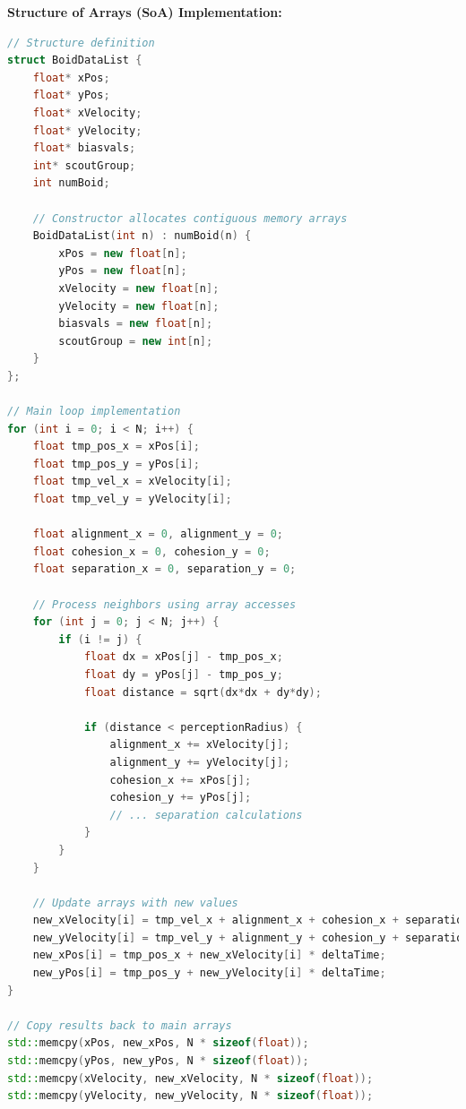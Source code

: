\documentclass[10pt,twocolumn,letterpaper]{article}
\begin{document}
\textbf{Structure of Arrays (SoA) Implementation:}
\begin{lstlisting}[language=C++, caption=SoA data structure and main loop]
// Structure definition
struct BoidDataList {
    float* xPos;
    float* yPos;
    float* xVelocity;
    float* yVelocity;
    float* biasvals;
    int* scoutGroup;
    int numBoid;
    
    // Constructor allocates contiguous memory arrays
    BoidDataList(int n) : numBoid(n) {
        xPos = new float[n];
        yPos = new float[n];
        xVelocity = new float[n];
        yVelocity = new float[n];
        biasvals = new float[n];
        scoutGroup = new int[n];
    }
};

// Main loop implementation
for (int i = 0; i < N; i++) {
    float tmp_pos_x = xPos[i];
    float tmp_pos_y = yPos[i];
    float tmp_vel_x = xVelocity[i];
    float tmp_vel_y = yVelocity[i];
    
    float alignment_x = 0, alignment_y = 0;
    float cohesion_x = 0, cohesion_y = 0;
    float separation_x = 0, separation_y = 0;
    
    // Process neighbors using array accesses
    for (int j = 0; j < N; j++) {
        if (i != j) {
            float dx = xPos[j] - tmp_pos_x;
            float dy = yPos[j] - tmp_pos_y;
            float distance = sqrt(dx*dx + dy*dy);
            
            if (distance < perceptionRadius) {
                alignment_x += xVelocity[j];
                alignment_y += yVelocity[j];
                cohesion_x += xPos[j];
                cohesion_y += yPos[j];
                // ... separation calculations
            }
        }
    }
    
    // Update arrays with new values
    new_xVelocity[i] = tmp_vel_x + alignment_x + cohesion_x + separation_x;
    new_yVelocity[i] = tmp_vel_y + alignment_y + cohesion_y + separation_y;
    new_xPos[i] = tmp_pos_x + new_xVelocity[i] * deltaTime;
    new_yPos[i] = tmp_pos_y + new_yVelocity[i] * deltaTime;
}

// Copy results back to main arrays
std::memcpy(xPos, new_xPos, N * sizeof(float));
std::memcpy(yPos, new_yPos, N * sizeof(float));
std::memcpy(xVelocity, new_xVelocity, N * sizeof(float));
std::memcpy(yVelocity, new_yVelocity, N * sizeof(float));
\end{lstlisting}
\end{document}
